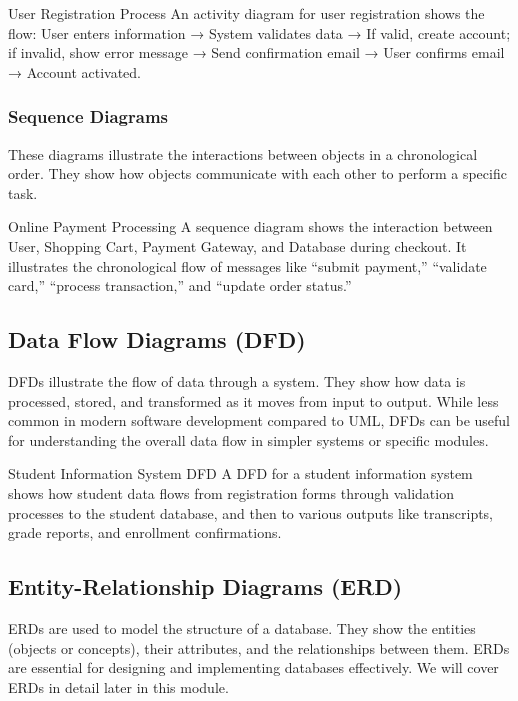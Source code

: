 \begin{examplecard}{User Registration Process}
  An activity diagram for user registration shows the flow: User enters information → System validates data → If valid, create account; if invalid, show error message → Send confirmation email → User confirms email → Account activated.
\end{examplecard}

\subsubsection{Sequence Diagrams}

These diagrams illustrate the interactions between objects in a chronological order. They show how objects communicate with each other to perform a specific task.

\begin{examplecard}{Online Payment Processing}
  A sequence diagram shows the interaction between User, Shopping Cart, Payment Gateway, and Database during checkout. It illustrates the chronological flow of messages like ``submit payment,'' ``validate card,'' ``process transaction,'' and ``update order status.''
\end{examplecard}

\subsection{Data Flow Diagrams (DFD)}

DFDs illustrate the flow of data through a system. They show how data is processed, stored, and transformed as it moves from input to output. While less common in modern software development compared to UML, DFDs can be useful for understanding the overall data flow in simpler systems or specific modules.

\begin{examplecard}{Student Information System DFD}
  A DFD for a student information system shows how student data flows from registration forms through validation processes to the student database, and then to various outputs like transcripts, grade reports, and enrollment confirmations.
\end{examplecard}

\subsection{Entity-Relationship Diagrams (ERD)}

ERDs are used to model the structure of a database. They show the entities (objects or concepts), their attributes, and the relationships between them. ERDs are essential for designing and implementing databases effectively. We will cover ERDs in detail later in this module.

